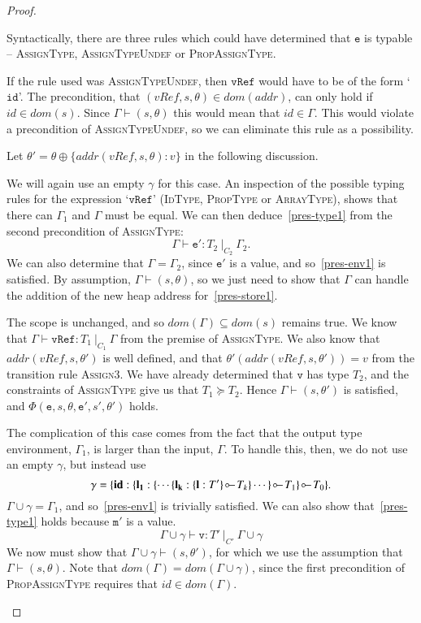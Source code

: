 \begin{proof}
\begin{case}[Assign3]
	Syntactically, there are three rules which could have determined that
	$\mathtt{e}$ is typable -- \textsc{AssignType}, \textsc{AssignTypeUndef} or
	\textsc{PropAssignType}. 

	If the rule used was \textsc{AssignTypeUndef}, then $\mathtt{vRef}$ would
	have to be of the form `$\mathtt{id}$'. The precondition, that $(vRef,s,
	\theta)\in dom(addr)$, can only hold if $id\in dom(s)$. Since
	$\Gamma\vdash(s,\theta)$ this would mean that $id\in\Gamma$. This would
	violate a precondition of \textsc{AssignTypeUndef}, so we can eliminate
	this rule as a possibility.

	Let $\theta'=\theta\oplus\{addr(vRef,s,\theta):v\}$ in the following discussion.

	\begin{subcase}[AssignType]
	  We will again use an empty $\gamma$ for this case.
	  An inspection of the possible typing rules for the expression `$\mathtt{vRef}$'
	  (\textsc{IdType, PropType} or \textsc{ArrayType}), shows that there can
	  $\Gamma_1$ and $\Gamma$ must be equal.
	  We can then deduce~\eqref{pres-type1} from the second precondition of \textsc{AssignType}:
	  $$\Gamma\vdash\mathtt{e'}:T_2\ |_{C_2}\ \Gamma_2.$$ 
	  We can also determine that $\Gamma=\Gamma_2$, since $\mathtt{e'}$ is a value, and
	  so~\eqref{pres-env1} is satisfied. By assumption, $\Gamma\vdash(s,\theta)$, so
	  we just need to show that
	  $\Gamma$ can handle the addition of the new heap address for~\eqref{pres-store1}.

 	  The scope is unchanged, and so $dom(\Gamma)\subseteq dom(s)$ remains true.
	  We know that $\Gamma\vdash\mathtt{vRef}:T_1\ |_{C_1}\ \Gamma$ from the premise of 
	  \textsc{AssignType}. We also know that $addr(vRef, s, \theta')$ is 
	  well defined, and that $\theta'(addr(vRef, s, \theta')) = v$ 
	  from the transition rule \textsc{Assign3}. We have already determined
	  that $\mathtt{v}$ has type $T_2$, and the constraints of \textsc{AssignType}
	  give us that $T_1\succeq T_2$. Hence $\Gamma\vdash(s,\theta')$ is satisfied,
	  and $\Phi(\mathtt{e},s,\theta,\mathtt{e'},s',\theta')$ holds.
  	\end{subcase}

	\begin{subcase}[PropAssignType]
	  The complication of this case comes from
	  the fact that the output type environment, $\Gamma_1$, is larger than the input, $\Gamma$.
	  To handle this, then, we do not use an empty $\gamma$, but instead use
	  $$\gamma=\{\textbf{id}: \{ \mathbf{l_1}: \{\cdots \{\mathbf{l_k}:\{\mathbf{l}: T'\}\orig T_k \} \cdots\} \orig T_1\}\orig T_0\}.$$
	  $\Gamma\!\cup\!\gamma=\Gamma_1$, and so~\eqref{pres-env1} is trivially
	  satisfied. We can also show that~\eqref{pres-type1} holds because $\mathtt{m'}$ is a value.
	  $$\Gamma\!\cup\!\gamma\vdash\mathtt{v}:T'\ |_{C'}\ \Gamma\!\cup\!\gamma$$
	  We now must show that $\Gamma\!\cup\!\gamma\vdash(s,
	  \theta')$, for which we use the assumption that
	  $\Gamma\vdash(s,\theta)$. Note that
	  $dom(\Gamma)=dom(\Gamma\cup\gamma)$, since the first precondition
	  of \textsc{PropAssignType} requires that $id\in dom(\Gamma)$.


\end{subcase}
\end{case}
\end{proof}
